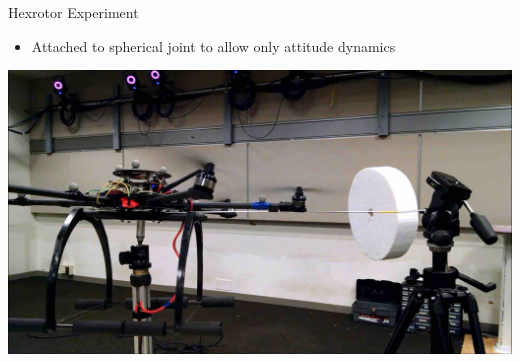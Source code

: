 \begin{frame}{Hexrotor Experiment} %
\begin{itemize}
    \item Attached to spherical joint to allow only attitude dynamics
\end{itemize}
\begin{center}
    \href{https://youtu.be/dsmAbwQram4?t=20s}{\includegraphics[height=0.7\textheight]{figures/2016ACC/hexrotor}}
\end{center}
\end{frame}   %
